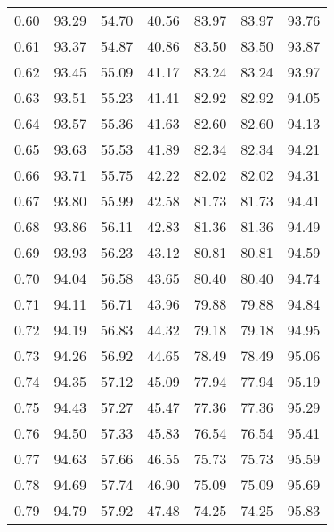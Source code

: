 \begin{tabular}{|c|c|c|c|c|c|c|}
      0.60 &     93.29 &     54.70 &      40.56 &   83.97 &      83.97 &         93.76 \\
      0.61 &     93.37 &     54.87 &      40.86 &   83.50 &      83.50 &         93.87 \\
      0.62 &     93.45 &     55.09 &      41.17 &   83.24 &      83.24 &         93.97 \\
      0.63 &     93.51 &     55.23 &      41.41 &   82.92 &      82.92 &         94.05 \\
      0.64 &     93.57 &     55.36 &      41.63 &   82.60 &      82.60 &         94.13 \\
      0.65 &     93.63 &     55.53 &      41.89 &   82.34 &      82.34 &         94.21 \\
      0.66 &     93.71 &     55.75 &      42.22 &   82.02 &      82.02 &         94.31 \\
      0.67 &     93.80 &     55.99 &      42.58 &   81.73 &      81.73 &         94.41 \\
      0.68 &     93.86 &     56.11 &      42.83 &   81.36 &      81.36 &         94.49 \\
      0.69 &     93.93 &     56.23 &      43.12 &   80.81 &      80.81 &         94.59 \\
      0.70 &     94.04 &     56.58 &      43.65 &   80.40 &      80.40 &         94.74 \\
      0.71 &     94.11 &     56.71 &      43.96 &   79.88 &      79.88 &         94.84 \\
      0.72 &     94.19 &     56.83 &      44.32 &   79.18 &      79.18 &         94.95 \\
      0.73 &     94.26 &     56.92 &      44.65 &   78.49 &      78.49 &         95.06 \\
      0.74 &     94.35 &     57.12 &      45.09 &   77.94 &      77.94 &         95.19 \\
      0.75 &     94.43 &     57.27 &      45.47 &   77.36 &      77.36 &         95.29 \\
      0.76 &     94.50 &     57.33 &      45.83 &   76.54 &      76.54 &         95.41 \\
      0.77 &     94.63 &     57.66 &      46.55 &   75.73 &      75.73 &         95.59 \\
      0.78 &     94.69 &     57.74 &      46.90 &   75.09 &      75.09 &         95.69 \\
      0.79 &     94.79 &     57.92 &      47.48 &   74.25 &      74.25 &         95.83 \\

\end{tabular}
